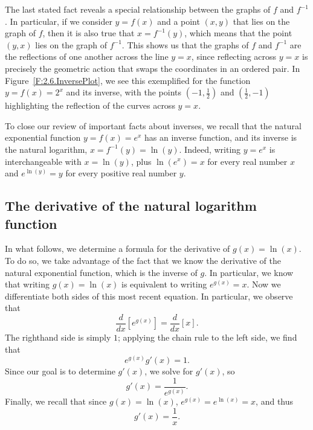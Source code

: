 The last stated fact reveals a special relationship between the graphs of $f$ and $f^{-1}$.  In particular, if we consider $y = f(x)$ and a point $(x,y)$ that lies on the graph of $f$, then it is also true that $x = f^{-1}(y)$, which means that the point $(y,x)$ lies on the graph of $f^{-1}$.  This shows us that the graphs of $f$ and $f^{-1}$ are the reflections of one another across the line $y = x$, since reflecting across $y = x$ is precisely the geometric action that swaps the coordinates in an ordered pair.  In Figure~\ref{F:2.6.InversePlot}, we see this exemplified for the function $y = f(x) = 2^x$ and its inverse, with the points $(-1,\frac{1}{2})$ and $(\frac{1}{2},-1)$ highlighting the reflection of the curves across $y = x$.

To close our review of important facts about inverses, we recall that the natural exponential function $y = f(x) = e^x$ has an inverse function, and its inverse is the natural logarithm, $x = f^{-1}(y) = \ln(y)$.  Indeed, writing $y = e^x$ is interchangeable with $x = \ln(y)$, plus
$\ln(e^x) = x$ for every real number $x$ and $e^{\ln(y)} = y$ for every positive real number $y.$

\subsection*{The derivative of the natural logarithm function}

In what follows, we determine a formula for the derivative of $g(x) = \ln(x)$.  To do so, we take advantage of the fact that we know the derivative of the natural exponential function, which is the inverse of $g$.  In particular, we know that writing $g(x) = \ln(x)$ is equivalent to writing $e^{g(x)} = x$.  Now we differentiate both sides of this most recent equation.  In particular, we observe that
$$\frac{d}{dx}\left[e^{g(x)}\right] = \frac{d}{dx}[x].$$
The righthand side is simply $1$; applying the chain rule to the left side, we find that
$$e^{g(x)} g'(x) = 1.$$
Since our goal is to determine $g'(x)$, we solve for $g'(x)$, so 
$$g'(x) = \frac{1}{e^{g(x)}}.$$
Finally, we recall that since $g(x) = \ln(x)$, $e^{g(x)} = e^{\ln(x)} = x$, and thus
$$g'(x) = \frac{1}{x}.$$


